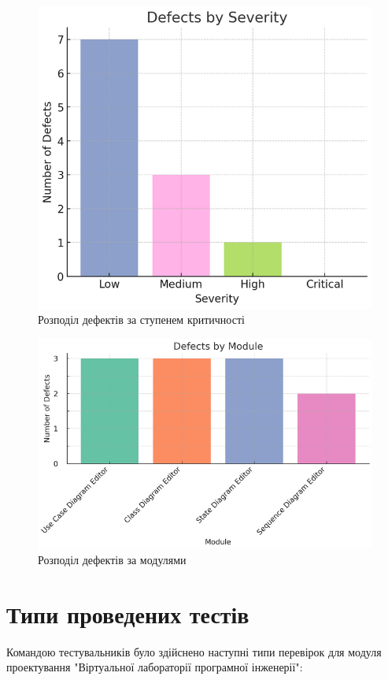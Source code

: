 \documentclass[oneside,14pt]{extarticle}
\begin{document}
\begin{normalsize}
	\begin{figure}[H]
		\centering
		\includegraphics[width=0.7\columnwidth]{2}
		\caption{Розподіл дефектів за ступенем критичності}
	\end{figure}
	
	\begin{figure}[H]
		\centering
		\includegraphics[width=0.7\columnwidth]{3}
		\caption{Розподіл дефектів за модулями}
	\end{figure}
	
	\section{Типи проведених тестів}
	Командою тестувальників було здійснено наступні типи перевірок для модуля проектування "Віртуальної лабораторії програмної інженерії":
	

\end{normalsize}
\end{document}
